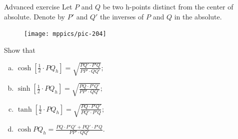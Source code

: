 \begin{thm}{Advanced exercise}\label{ex:cosh}
Let $P$ and $Q$ be two h-points distinct from the center of absolute.
Denote by $P'$ and $Q'$ the inverses of $P$ and $Q$ in the absolute.

\begin{figure}
\centering
\texttt{[image: mppics/pic-204]}
\end{figure}

Show that 
\medskip
\begin{enumerate}[(a)]
\item\label{ex:cosh/2} 
$\displaystyle{\cosh[\tfrac12\cdot PQ_h]=\sqrt{\frac{PQ'\cdot P'Q}{PP'\cdot QQ'}};}$
\medskip
\item\label{ex:coshsinh} 
$\displaystyle{\sinh[\tfrac12\cdot PQ_h]=\sqrt{\frac{PQ\cdot P'Q'}{PP'\cdot QQ'}};}$
\medskip
\item\label{ex:coshtanh} 
$\displaystyle{\tanh[\tfrac12\cdot PQ_h]=\sqrt{\frac{PQ\cdot P'Q'}{PQ'\cdot P'Q}};}$
\medskip
\item\label{ex:coshcosh} 
$\displaystyle{\cosh PQ_h=\frac{PQ\cdot P'Q'+PQ'\cdot P'Q}{PP'\cdot QQ'}.}$
\end{enumerate}

\end{thm}

